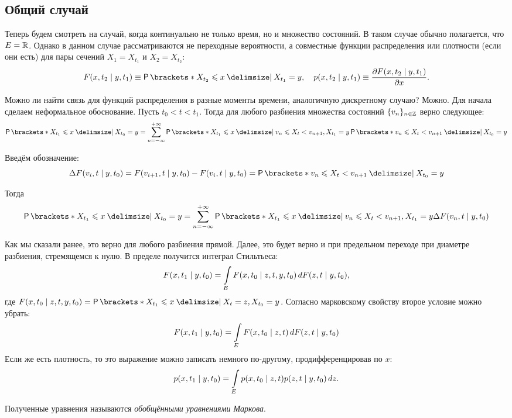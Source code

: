 \subsection{Общий случай}
Теперь будем смотреть на случай, когда континуально не только время, но и 
множество состояний. В таком случае обычно полагается, что \(E = \mathbb{R}\). Однако в 
данном случае рассматриваются не переходные вероятности, а совместные функции 
распределения или плотности (если они есть) для пары сечений \(X_{1} = 
X_{t_{1}}\) и \(X_{2} = X_{t_{2}}\):
\[
	F(x, t_{2} \mid y, t_{1}) \equiv \Pr{X_{t_{2}} \leq x \given X_{t_{1}} 
	= y}, \quad p(x, t_{2} \mid y, t_{1}) \equiv \frac{\partial F(x, t_{2} \mid 
	y, t_{1})}{\partial x}.
\]

Можно ли найти связь для функций распределения в разные моменты времени, 
аналогичную дискретному случаю? Можно. Для начала сделаем неформальное 
обоснование. Пусть \(t_{0} < t < t_{1}\). Тогда для любого разбиения множества 
состояний \(\{v_{n}\}_{n \in \mathbb{Z}}\) верно следующее:
\[
	\Pr{X_{t_{1}} \leq x \given X_{t_{0}} = y} = \sum_{n = -\infty}^{+\infty} 
	\Pr{X_{t_{1}} \leq x \given v_{n} \leq X_{t} < v_{n + 1}, X_{t_{1}} = 
	y}\Pr{v_{n} \leq X_{t} < v_{n + 1} \given X_{t_{0}} = y}
\]

Введём обозначение:
\[
	\Delta F(v_{i}, t \mid y, t_{0}) = F(v_{i + 1}, t \mid y, t_{0}) - F(v_{i}, 
	t \mid y, t_{0}) = \Pr{v_{n} \leq X_{t} < v_{n + 1} \given X_{t_{0}} = y}
\]

Тогда
\[
	\Pr{X_{t_{1}} \leq x \given X_{t_{0}} = y} = \sum_{n = -\infty}^{+\infty} 
	\Pr{X_{t_{1}} \leq x \given v_{n} \leq X_{t} < v_{n + 1}, X_{t_{1}} = 
	y}\Delta F(v_{n}, t \mid y, t_{0})
\]

Как мы сказали ранее, это верно для любого разбиения прямой. Далее, это будет 
верно и при предельном переходе при диаметре разбиения, стремящемся к нулю. В 
пределе получится интеграл Стильтьеса:
\[
	F(x, t_{1} \mid y, t_{0}) = \int\limits_{E} F(x, t_{0} \mid z, t, 
	y, t_{0})\mathop{}\!d F(z, t \mid y, t_{0}),
\]
где \(F(x, t_{0} \mid z, t, y, t_{0}) = \Pr{X_{t_{1}} \leq x \given X_{t} = z, 
X_{t_{0}} = y}\). Согласно марковскому свойству второе условие можно убрать:
\[
	F(x, t_{1} \mid y, t_{0}) = \int\limits_{E} F(x, t_{0} \mid z, t)\mathop{}\!d F(z, 
	t \mid y, t_{0})
\]
Если же есть плотность, то это выражение можно записать 
немного по-другому, продифференцировав по \(x\):
\[
	p(x, t_{1} \mid y, t_{0}) = \int\limits_{E} p(x, t_{0} \mid z, t)p(z, t 
	\mid y, t_{0})\mathop{}\!d z.
\]

Полученные уравнения называются \emph{обобщёнными уравнениями Маркова}.

